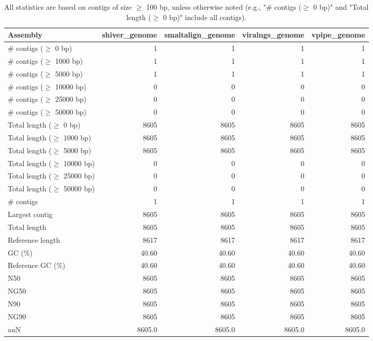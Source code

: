 \documentclass[12pt,a4paper]{article}
\begin{document}
\begin{table}[ht]
\begin{center}
\caption{All statistics are based on contigs of size $\geq$ 100 bp, unless otherwise noted (e.g., "\# contigs ($\geq$ 0 bp)" and "Total length ($\geq$ 0 bp)" include all contigs).}
\begin{tabular}{|l*{4}{|r}|}
\hline
Assembly & shiver\_genome & smaltalign\_genome & viralngs\_genome & vpipe\_genome \\ \hline
\# contigs ($\geq$ 0 bp) & 1 & 1 & 1 & 1 \\ \hline
\# contigs ($\geq$ 1000 bp) & 1 & 1 & 1 & 1 \\ \hline
\# contigs ($\geq$ 5000 bp) & 1 & 1 & 1 & 1 \\ \hline
\# contigs ($\geq$ 10000 bp) & 0 & 0 & 0 & 0 \\ \hline
\# contigs ($\geq$ 25000 bp) & 0 & 0 & 0 & 0 \\ \hline
\# contigs ($\geq$ 50000 bp) & 0 & 0 & 0 & 0 \\ \hline
Total length ($\geq$ 0 bp) & 8605 & 8605 & 8605 & 8605 \\ \hline
Total length ($\geq$ 1000 bp) & 8605 & 8605 & 8605 & 8605 \\ \hline
Total length ($\geq$ 5000 bp) & 8605 & 8605 & 8605 & 8605 \\ \hline
Total length ($\geq$ 10000 bp) & 0 & 0 & 0 & 0 \\ \hline
Total length ($\geq$ 25000 bp) & 0 & 0 & 0 & 0 \\ \hline
Total length ($\geq$ 50000 bp) & 0 & 0 & 0 & 0 \\ \hline
\# contigs & 1 & 1 & 1 & 1 \\ \hline
Largest contig & 8605 & 8605 & 8605 & 8605 \\ \hline
Total length & 8605 & 8605 & 8605 & 8605 \\ \hline
Reference length & 8617 & 8617 & 8617 & 8617 \\ \hline
GC (\%) & 40.60 & 40.60 & 40.60 & 40.60 \\ \hline
Reference GC (\%) & 40.60 & 40.60 & 40.60 & 40.60 \\ \hline
N50 & 8605 & 8605 & 8605 & 8605 \\ \hline
NG50 & 8605 & 8605 & 8605 & 8605 \\ \hline
N90 & 8605 & 8605 & 8605 & 8605 \\ \hline
NG90 & 8605 & 8605 & 8605 & 8605 \\ \hline
auN & 8605.0 & 8605.0 & 8605.0 & 8605.0 \\ \hline

\end{tabular}
\end{center}
\end{table}
\end{document}
